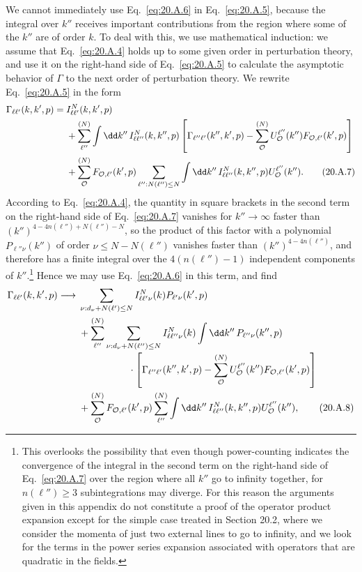 We cannot immediately use Eq.~\eqref{eq:20.A.6} in Eq.~\eqref{eq:20.A.5}, because the integral over $k''$ receives important contributions from the region where some of the $k''$ are of order $k$. To deal with this, we use mathematical induction: we assume that Eq.~\eqref{eq:20.A.4} holds up to some given order in perturbation theory, and use it on the right-hand side of Eq.~\eqref{eq:20.A.5} to calculate the asymptotic behavior of $\Gamma$ to the next order of perturbation theory. We rewrite Eq.~\eqref{eq:20.A.5} in the form
\begin{align}
\Gamma_{\ell\ell'}(k,k',p)
={}&I_{\ell\ell'}^N(k,k',p)
\notag\\
&+\sum_{\ell''}^{(N)}
\int \dd k''\,I_{\ell\ell''}^N(k,k'',p)
\left[
\Gamma_{\ell''\ell'}(k'',k',p)
-\sum_{\mathcal O}^{(N)}
U_{\mathcal O}^{\ell''}(k'')
F_{\mathcal O,\ell'}(k',p)
\right]
\notag\\
&+\sum_{\mathcal O}^{(N)}
F_{\mathcal O,\ell'}(k',p)
\sum_{\ell'':N(\ell'')\leq N}
\int \dd k''\,I_{\ell\ell''}^N(k,k'',p)
U_{\mathcal O}^{\ell''}(k'').
\tag{20.A.7}\label{eq:20.A.7}
\end{align}
According to Eq.~\eqref{eq:20.A.4}, the quantity in square brackets in the second term on the right-hand side of Eq.~\eqref{eq:20.A.7} vanishes for $k''\to\infty$ faster than $(k'')^{4-4n(\ell'')+N(\ell'')-N}$, so the product of this factor with a polynomial $P_{\ell''\nu}(k'')$ of order $\nu\leq N-N(\ell'')$ vanishes faster than $(k'')^{4-4n(\ell'')}$, and therefore has a finite integral over the $4(n(\ell'')-1)$ independent components of $k''$.\footnote{This overlooks the possibility that even though power-counting indicates the convergence of the integral in the second term on the right-hand side of Eq.~\eqref{eq:20.A.7} over the region where all $k''$ go to infinity together, for $n(\ell'')\geq3$ subintegrations may diverge. For this reason the arguments given in this appendix do not constitute a proof of the operator product expansion except for the simple case treated in Section 20.2, where we consider the momenta of just two external lines to go to infinity, and we look for the terms in the power series expansion associated with operators that are quadratic in the fields.} Hence we may use Eq.~\eqref{eq:20.A.6} in this term, and find
\begingroup
\allowdisplaybreaks[0]
\begin{align}
\Gamma_{\ell\ell'}(k,k',p)
\longrightarrow{}&
\sum_{\nu:d_\nu+N(\ell')\leq N}
I_{\ell\ell'\nu}^N(k)
P_{\ell'\nu}(k',p)
\notag\\
&+\sum_{\ell''}^{(N)}
\sum_{\nu:d_\nu+N(\ell'')\leq N}
I_{\ell\ell''\nu}^N(k)
\int \dd k''\,P_{\ell''\nu}(k'',p)
\notag\\[-2pt]
&\hspace{18mm}\cdot
\left[
\Gamma_{\ell''\ell'}(k'',k',p)
-\sum_{\mathcal O}^{(N)}
U_{\mathcal O}^{\ell''}(k'')
F_{\mathcal O,\ell'}(k',p)
\right]
\notag\\
&+\sum_{\mathcal O}^{(N)}
F_{\mathcal O,\ell'}(k',p)
\sum_{\ell''}^{(N)}
\int \dd k''\,I_{\ell\ell''}^N(k,k'',p)
U_{\mathcal O}^{\ell''}(k''),
\tag{20.A.8}\label{eq:20.A.8}
\end{align}
